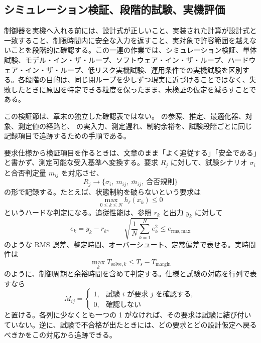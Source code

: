 \subsection{シミュレーション検証、段階的試験、実機評価}

制御器を実機へ入れる前には、設計式が正しいこと、実装された計算が設計式と一致すること、制限時間内に安全な入力を返すこと、実対象で許容範囲を越えないことを段階的に確認する。この一連の作業では、シミュレーション検証、単体試験、モデル・イン・ザ・ループ、ソフトウェア・イン・ザ・ループ、ハードウェア・イン・ザ・ループ、低リスク実機試験、運用条件での実機試験を区別する。各段階の目的は、同じ閉ループを少しずつ現実に近づけることではなく、失敗したときに原因を特定できる粒度を保ったまま、未検証の仮定を減らすことである。

この検証節は、章末の独立した確認表ではない。 の参照、推定、最適化器、対象、測定値の経路と、 の実入力、測定遅れ、制約余裕を、試験段階ごとに同じ記録項目で追跡するための手順である。

要求仕様から検証項目を作るときは、文章のまま「よく追従する」「安全である」と書かず、測定可能な受入基準へ変換する。要求 $R_j$ に対して、試験シナリオ $\sigma_i$ と合否判定量 $m_{ij}$ を対応させ、
\begin{equation}
  R_j
  \longrightarrow
  \{\sigma_i,\ m_{ij},\ \bar{m}_{ij},\ \text{合否規則}\}
\end{equation}
の形で記録する。たとえば、状態制約を破らないという要求は
\begin{equation}
  \max_{0\le k\le N} h_\ell(x_k)\le0
\end{equation}
というハードな判定になる。追従性能は、参照 $r_k$ と出力 $y_k$ に対して
\begin{equation}
  e_k=y_k-r_k,
  \qquad
  \sqrt{\frac{1}{N}\sum_{k=1}^{N}e_k^2}\le e_{\mathrm{rms,max}}
\end{equation}
のような RMS 誤差、整定時間、オーバーシュート、定常偏差で表せる。実時間性は
\begin{equation}
  \max_k T_{\mathrm{solve},k}\le T_s-T_{\mathrm{margin}}
\end{equation}
のように、制御周期と余裕時間を含めて判定する。仕様と試験の対応を行列で表すなら
\begin{equation}
  M_{ij}=
  \begin{cases}
    1, & \text{試験 } i \text{ が要求 } j \text{ を確認する},\\
    0, & \text{確認しない}
  \end{cases}
\end{equation}
と置ける。各列に少なくとも一つの 1 がなければ、その要求は試験に結び付いていない。逆に、試験で不合格が出たときには、どの要求とどの設計仮定へ戻るべきかをこの対応から追跡できる。


